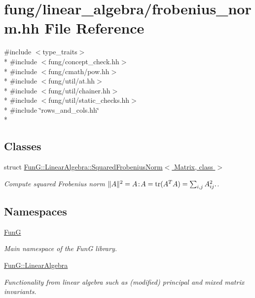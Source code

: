 \hypertarget{frobenius__norm_8hh}{\section{fung/linear\-\_\-algebra/frobenius\-\_\-norm.hh File Reference}
\label{frobenius__norm_8hh}
}
{\ttfamily \#include $<$type\-\_\-traits$>$}\\*
{\ttfamily \#include $<$fung/concept\-\_\-check.\-hh$>$}\\*
{\ttfamily \#include $<$fung/cmath/pow.\-hh$>$}\\*
{\ttfamily \#include $<$fung/util/at.\-hh$>$}\\*
{\ttfamily \#include $<$fung/util/chainer.\-hh$>$}\\*
{\ttfamily \#include $<$fung/util/static\-\_\-checks.\-hh$>$}\\*
{\ttfamily \#include \char`\"{}rows\-\_\-and\-\_\-cols.\-hh\char`\"{}}\\*
\subsection*{Classes}
\begin{DoxyCompactItemize}
\item 
struct \hyperlink{structFunG_1_1LinearAlgebra_1_1SquaredFrobeniusNorm}{Fun\-G\-::\-Linear\-Algebra\-::\-Squared\-Frobenius\-Norm$<$ Matrix, class $>$}
\begin{DoxyCompactList}\small\item\em Compute squared Frobenius norm $ \|A\|^2 = A\negthinspace : \negthinspace A = \mathrm{tr}(A^TA) = \sum_{i,j} A_{ij}^2. $. \end{DoxyCompactList}\end{DoxyCompactItemize}
\subsection*{Namespaces}
\begin{DoxyCompactItemize}
\item 
\hyperlink{namespaceFunG}{Fun\-G}
\begin{DoxyCompactList}\small\item\em Main namespace of the Fun\-G library. \end{DoxyCompactList}\item 
\hyperlink{namespaceFunG_1_1LinearAlgebra}{Fun\-G\-::\-Linear\-Algebra}
\begin{DoxyCompactList}\small\item\em Functionality from linear algebra such as (modified) principal and mixed matrix invariants. \end{DoxyCompactList}\end{DoxyCompactItemize}

